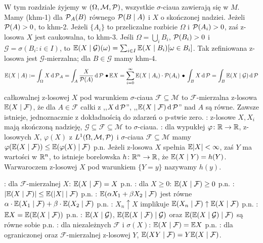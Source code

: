 W  tym rozdziale żyjemy w $(\Omega, \mathcal M, \operatorname{\mathcal{P}})$, wszystkie $\sigma$-ciaua zawierają się w $M$.
Mamy  (khm-1) dla $\operatorname{\mathcal{P}}_A(B)$ równego $\operatorname{\mathcal{P}} (B \mid A)$ i $X$ o skończonej nadziei.
Jeżeli $\operatorname{\mathcal{P}}(A) > 0$, to khm-2.
Jeżeli $\{A_i\}$ to przeliczalne rozbicie $\Omega$ i $\operatorname{\mathcal{P}}(A_i) > 0$, zaś z-losowa $X$ jest caukowalna, to khm-3.
Jeśli $\Omega = \bigcup_i B_i$, $\operatorname{\mathcal{P}}(B_i) > 0$ i $\mathcal G = \sigma(B_i : i \in I)$, to $\mathbb{E} (X \mid \mathcal G)(\omega) = \sum_{i \in I} \mathbb{E} (X \mid B_i) [\omega \in B_i]$. 
Tak zefiniowana z-losowa jest $\mathcal G$-mierzalna; dla $B \in \mathcal G$ mamy khm-4.
\[
	\mathbb{E} (X \mid A) := \int_\Omega X \,\textrm{d} \operatorname{\mathcal{P}}_A = \int_A \frac{X}{\operatorname{\mathcal{P}}(A)} \,\textrm{d} \operatorname{\mathcal{P}} \, \bullet \,
	\mathbb{E} X = \sum_{i=0}^\infty \mathbb{E} (X \mid A_i) \cdot \operatorname{\mathcal{P}} (A_i) \, \bullet \,
	\int_B X \,\textrm{d}\operatorname{\mathcal{P}} = \int_B \mathbb{E} (X \mid \mathcal G) \,\textrm{d}\operatorname{\mathcal{P}}
\]

  całkowalnej z-losowej $X$ pod warunkiem $\sigma$-ciaua $\mathcal F \subseteq \mathcal M$ to $\mathcal F$-mierzalna z-losowa $\mathbb{E} (X \mid \mathcal F)$, że dla $A \in \mathcal F$ całki z ,,$X \, \textrm{d} \operatorname{\mathcal{P}}$'', ,,$\mathbb{E} (X \mid \mathcal F) \, \textrm{d} \operatorname{\mathcal{P}}$'' nad $A$ są równe.
Zawsze istnieje, jednoznacznie z dokładnością do zdarzeń o p-stwie zero.
: z-losowe $X, X_i$ mają skończoną nadzieję, $\mathcal G \subseteq \mathcal F \subseteq \mathcal M$ to $\sigma$-ciaua.
: dla wypukłej $\varphi \colon \mathbb{R} \to \mathbb{R}$, z-losowych $X$, $\varphi(X)$ z $L^1(\Omega, \mathcal M, \operatorname{\mathcal{P}})$ i $\sigma$-ciaua $\mathcal F \subseteq \mathcal M$ mamy $\varphi (\mathbb{E}(X \mid \mathcal F)) \le \mathbb{E} (\varphi(X) \mid \mathcal F)$ p.n.
Jeżeli z-losowa $X$ spełnia $\mathbb{E} |X| < \infty$, zaś $Y$ ma wartości w $\mathbb{R}^n$, to istnieje borelowska $h \colon \mathbb{R}^n \to \mathbb{R}$, że $\mathbb{E} (X \mid Y) = h(Y)$.
Warwaroczem z-losowej $X$ pod warunkiem $\{Y = y\}$ nazywamy $h(y)$.

: dla $\mathcal F$-mierzalnej $X$: $\mathbb{E} (X\mid \mathcal F) = X$ p.n.
: dla $X \ge 0$: $\mathbb{E} (X \mid \mathcal F) \ge 0$ p.n.
: $|\mathbb{E}(X \mid \mathcal F)| \le \mathbb{E} (|X| \mid \mathcal F)$ p.n.
: $\mathbb{E} (\alpha X_1 + \beta X_2 \mid \mathcal F)$ jest równe $\alpha \cdot \mathbb{E} (X_1 \mid \mathcal F) + \beta \cdot \mathbb{E} (X_2 \mid \mathcal F)$ p.n.
: $X_n \uparrow X$ implikuje $\mathbb{E} (X_n \mid \mathcal F) \uparrow \mathbb{E}(X \mid \mathcal F)$ p.n. 
: $\mathbb{E} X = \mathbb{E}( \mathbb{E} (X \mid \mathcal F))$ p.n.
: $\mathbb{E} (X \mid \mathcal G)$, $\mathbb{E} (\mathbb{E} (X \mid  \mathcal F) \mid  \mathcal G)$ oraz $\mathbb{E} (\mathbb{E} (X \mid  \mathcal G) \mid \mathcal F)$ są równe sobie p.n.
: dla niezależnych $\mathcal F$ i $\sigma(X)$: $\mathbb{E}(X \mid \mathcal F) = \mathbb{E} X$ p.n.
: dla ograniczonej oraz $\mathcal F$-mierzalnej z-losowej $Y$, $\mathbb{E} (XY \mid \mathcal F) = Y \mathbb{E} (X \mid \mathcal F)$.

